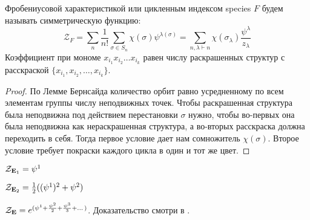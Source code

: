 \begin{statement}
Фробениусовой характеристикой или цикленным индексом species $F$ будем называть
симметрическую функцию:
\begin{equation}
\label{eq:fr}
\mathcal Z_F =
\sum_{n}\frac{1}{n!}\sum_{\sigma \in S_n}\chi(\sigma)\psi^{\lambda(\sigma)} =
\sum_{n, \lambda \vdash n}\chi(\sigma_{\lambda})
\frac{\psi^{\lambda}}{z_{\lambda}}
\end{equation}
Коэффициент при мономе $x_{i_1} x_{i_2} \dots x_{i_k}$ равен числу
раскрашенных структур с расскраской $\{x_{i_1}, x_{i_2},
\dots, x_{i_k}\}$.

\end{statement}
\begin{proof}
По Лемме Бернсайда количество орбит равно усредненному по всем элементам
группы числу неподвижных точек. Чтобы раскрашенная структура была неподвижна под
действием перестановки $\sigma$ нужно, чтобы во-первых она была неподвижна как
нераскрашенная структура, а во-вторых расскраска должна переходить в себя.
Тогда первое условие дает нам сомножитель
$\chi(\sigma)$. Второе условие требует покраски каждого
цикла в один и тот же цвет.
\end{proof}

\begin{example}
$\mathcal Z_{\mathbf E_1} = \psi^1$
\end{example}

\begin{example}
$\mathcal Z_{\mathbf E_2} = \frac{1}{2}((\psi^1)^2 + \psi^2)$
\end{example}

\begin{example}
$\mathcal Z_{\mathbf E} = e^{(\psi^1 + \frac{\psi^2}{2} + \frac{\psi^3}{3} +
\dots)}$. Доказательство смотри в \cite{BergTrees}.
\end{example}

